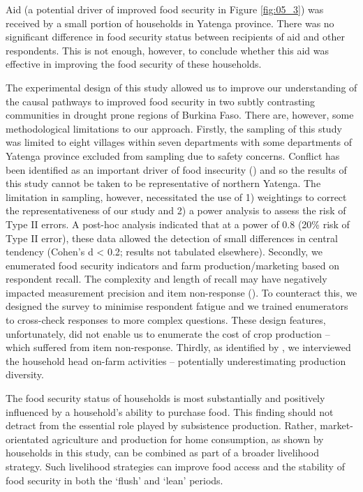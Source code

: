 Aid (a potential driver of improved food security in Figure \ref{fig:05_3}) was received by a small portion of households in Yatenga province. There was no significant difference in food security status between recipients of aid and other respondents. This is not enough, however, to conclude whether this aid was effective in improving the food security of these households.

The experimental design of this study allowed us to improve our understanding of the causal pathways to improved food security in two subtly contrasting communities in drought prone regions of Burkina Faso. There are, however, some methodological limitations to our approach. Firstly, the sampling of this study was limited to eight villages within seven departments with some departments of Yatenga province excluded from sampling due to safety concerns. Conflict has been identified as an important driver of food insecurity (\citealp{FAO2018}) and so the results of this study cannot be taken to be representative of northern Yatenga. The limitation in sampling, however, necessitated the use of 1) weightings to correct the representativeness of our study and 2) a power analysis to assess the risk of Type II errors. A post-hoc analysis indicated that at a power of 0.8 (20\% risk of Type II error), these data allowed the detection of small differences in central tendency (Cohen's d {\textless} 0.2; results not tabulated elsewhere). Secondly, we enumerated food security indicators and farm production/marketing based on respondent recall. The complexity and length of recall may have negatively impacted measurement precision and item non-response (\citealp{Beegle2012}). To counteract this, we designed the survey to minimise respondent fatigue and we trained enumerators to cross-check responses to more complex questions. These design features, unfortunately, did not enable us to enumerate the cost of crop production -- which suffered from item non-response. Thirdly, as identified by \citet{Some2018}, we interviewed the household head on-farm activities -- potentially underestimating production diversity.

The food security status of households is most substantially and positively influenced by a household's ability to purchase food. This finding should not detract from the essential role played by subsistence production. Rather, market-orientated agriculture and production for home consumption, as shown by households in this study, can be combined as part of a broader livelihood strategy. Such livelihood strategies can improve food access and the stability of food security in both the `flush' and `lean' periods.

